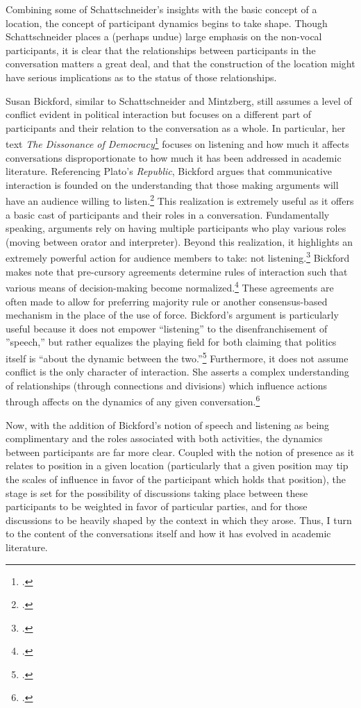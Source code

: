 \documentclass{article}
\begin{document}
Combining some of Schattschneider's insights with the basic concept of a location, the concept of participant dynamics begins to take shape.
Though Schattschneider places a (perhaps undue) large emphasis on the non-vocal participants, it is clear that the relationships between participants in the conversation matters a great deal, and that the construction of the location might have serious implications as to the status of those relationships.

Susan Bickford, similar to Schattschneider and Mintzberg, still assumes a level of conflict evident in political interaction but focuses on a different part of participants and their relation to the conversation as a whole.
In particular, her text \emph{The Dissonance of Democracy}\footcite{bickford96} focuses on listening and how much it affects conversations disproportionate to how much it has been addressed in academic literature. 
Referencing Plato's \emph{Republic}, Bickford argues that communicative interaction is founded on the understanding that those making arguments will have an audience willing to listen.\footcite[3]{bickford96}
This realization is extremely useful as it offers a basic cast of participants and their roles in a conversation.
Fundamentally speaking, arguments rely on having multiple participants who play various roles (moving between orator and interpreter).
Beyond this realization, it highlights an extremely powerful action for audience members to take: not listening.\footcite[3]{bickford96}
Bickford makes note that pre-cursory agreements determine rules of interaction such that various means of decision-making become normalized.\footcite[3--5. Simply put, these pre-cursory agreements can be understood as ``constitutions''---both formal and informal institutions which govern interaction.]{bickford96}
These agreements are often made to allow for preferring majority rule or another consensus-based mechanism in the place of the use of force.
Bickford's argument is particularly useful because it does not empower ``listening'' to the disenfranchisement of ''speech,'' but rather equalizes the playing field for both claiming that politics itself is ``about the dynamic between the two.''\footcite[4]{bickford96}
Furthermore, it does not assume conflict is the only character of interaction.
She asserts a complex understanding of relationships (through connections and divisions) which influence actions through affects on the dynamics of any given conversation.\footcite[9--11]{bickford96}

Now, with the addition of Bickford's notion of speech and listening as being complimentary and the roles associated with both activities, the dynamics between participants are far more clear.
Coupled with the notion of presence as it relates to position in a given location (particularly that a given position may tip the scales of influence in favor of the participant which holds that position), the stage is set for the possibility of discussions taking place between these participants to be weighted in favor of particular parties, and for those discussions to be heavily shaped by the context in which they arose.
Thus, I turn to the content of the conversations itself and how it has evolved in academic literature.
\end{document}
